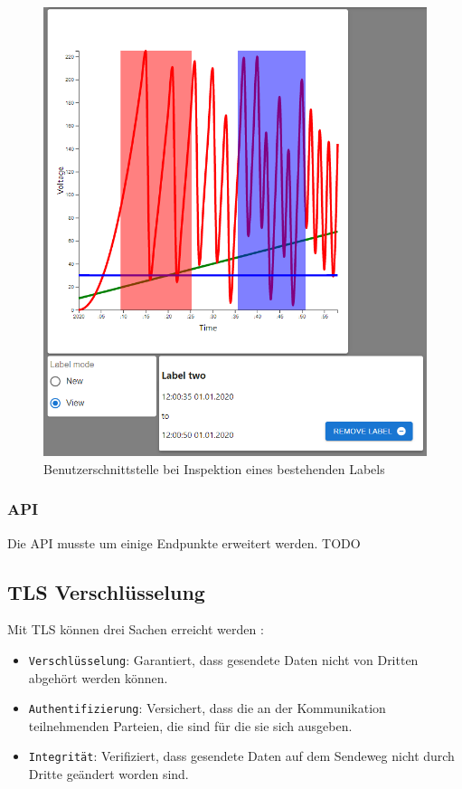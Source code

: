 \begin{figure}[H]
    \centering
    \includegraphics[width=1.0\textwidth]{gfx/viewLabel}
    \caption{Benutzerschnittstelle bei Inspektion eines bestehenden Labels}
    \label{fig:view_label}
\end{figure}

\subsubsection{API}
Die \ac{API} musste um einige Endpunkte erweitert werden.
TODO

\subsection{\ac{TLS} Verschlüsselung}

Mit \ac{TLS} können drei Sachen erreicht werden \parencite{what_is_tls}:

\begin{itemize}
    \item \texttt{Verschlüsselung}: Garantiert, dass gesendete Daten nicht von Dritten abgehört werden können.
    \item \texttt{Authentifizierung}: Versichert, dass die an der Kommunikation teilnehmenden Parteien, die sind für die sie sich ausgeben.
    \item \texttt{Integrität}: Verifiziert, dass gesendete Daten auf dem Sendeweg nicht durch Dritte geändert worden sind.
\end{itemize}

